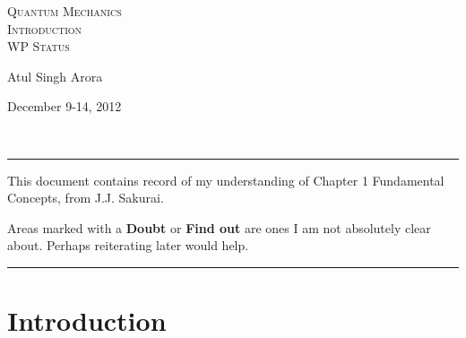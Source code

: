 \documentclass[12pt]{article}
\begin{document}



\begin{center}


\textsc{{\huge Quantum Mechanics\\}
Introduction\\
\small WP Status\\}
\begin{minipage}{0.4\textwidth}
\begin{flushleft} Atul Singh Arora \end{flushleft}
\end{minipage}
\begin{minipage}{0.4\textwidth}
\begin{flushright} {\small December 9-14, 2012} \end{flushright}
\end{minipage}
\\
\end{center}
\hrule
\vspace{12pt}

This document contains record of my understanding of Chapter 1 Fundamental Concepts, from J.J. Sakurai.
\par
Areas marked with a {\bf Doubt} or {\bf Find out} are ones I am not absolutely clear about. Perhaps reiterating later would help.\\
\hrule
\section{Introduction}
\end{document}
